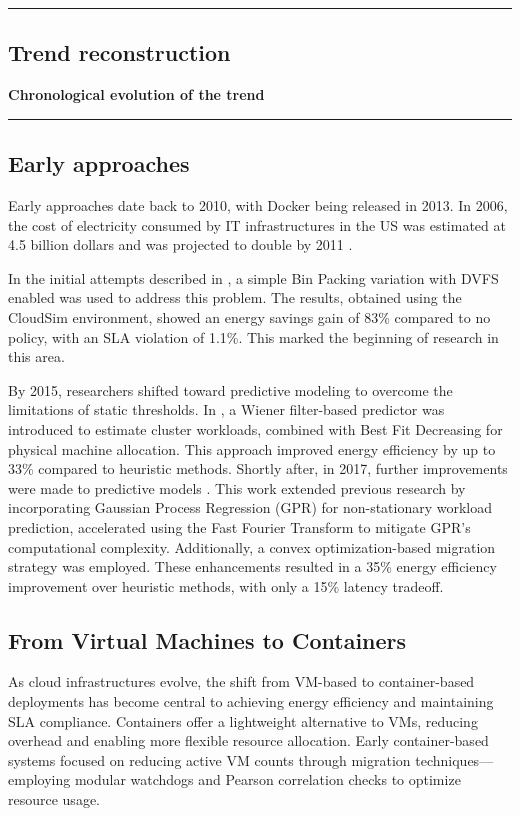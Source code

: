 {\color{gray}\hrule}
\begin{center}
\section{Trend reconstruction}
\textbf{Chronological evolution of the trend}
\bigskip
\end{center}
{\color{gray}\hrule}
\begin{multicols}{2}
\subsection{Early approaches}
Early approaches date back to 2010, with Docker being released in 2013. In 2006, the cost of electricity consumed by IT infrastructures in the US was estimated at 4.5 billion dollars and was projected to double by 2011 \cite{beloglazov_energy_2010}.

In the initial attempts described in \cite{beloglazov_energy_2010}, a simple Bin Packing variation with DVFS enabled was used to address this problem. The results, obtained using the CloudSim environment, showed an energy savings gain of 83\% compared to no policy, with an SLA violation of 1.1\%. This marked the beginning of research in this area.

By 2015, researchers shifted toward predictive modeling to overcome the limitations of static thresholds. In \cite{dabbagh_energy-efficient_2015},
a Wiener filter-based predictor was introduced to estimate cluster workloads, 
combined with Best Fit Decreasing for physical machine allocation.
This approach improved energy efficiency by up to 33\% compared to heuristic methods.
Shortly after, in 2017, further improvements were made to predictive models \cite{bui_energy_2017}.
This work extended previous research by incorporating Gaussian Process Regression (GPR) for non-stationary workload prediction,
accelerated using the Fast Fourier Transform to mitigate GPR's computational complexity.
Additionally, a convex optimization-based migration strategy was employed.
These enhancements resulted in a 35\% energy efficiency improvement over heuristic methods, with only a 15\% latency tradeoff.

\subsection{From Virtual Machines to Containers}

As cloud infrastructures evolve, the shift from VM-based to container-based deployments has become central to achieving energy efficiency and maintaining SLA compliance. Containers offer a lightweight alternative to VMs, reducing overhead and enabling more flexible resource allocation\cite{alahmad_availability-aware_2018}. Early container-based systems focused on reducing active VM counts through migration techniques—employing modular watchdogs and Pearson correlation checks to optimize resource usage\cite{alahmad_availability-aware_2018}.


\end{multicols}
